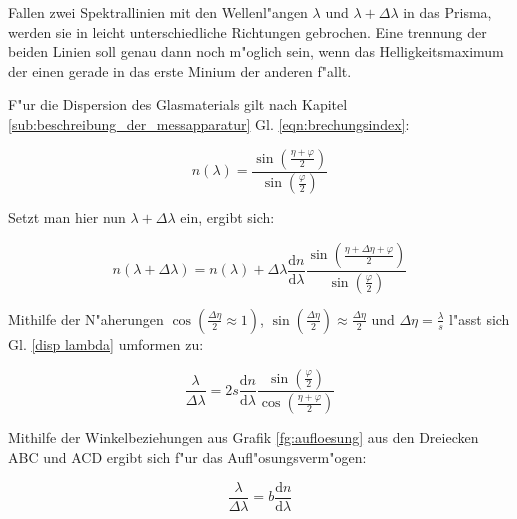 	Fallen zwei Spektrallinien mit den Wellenl"angen $\lambda$ und $\lambda + \Delta\lambda$ in das Prisma, werden sie in leicht unterschiedliche Richtungen gebrochen.
	Eine trennung der beiden Linien soll genau dann noch m"oglich sein, wenn das Helligkeitsmaximum der einen gerade in das erste Minium der anderen f"allt.

	F"ur die Dispersion des Glasmaterials gilt nach Kapitel \ref{sub:beschreibung_der_messapparatur} Gl. \eqref{eqn:brechungsindex}:

	\begin{equation}
		n(\lambda) = \frac{\sin( \frac{\eta + \varphi}{2} )}{\sin(\frac{\varphi}{2})} 
	\end{equation}

	Setzt man hier nun $\lambda + \Delta\lambda$ ein, ergibt sich:

	\begin{equation}
		n(\lambda + \Delta\lambda) = n(\lambda) + \Delta\lambda \frac{\mathrm{d}n}{\mathrm{d}\lambda}	\frac{\sin( \frac{\eta + \Delta\eta + \varphi}{2} )}{\sin(\frac{\varphi}{2})}  \label{disp lambda}
	\end{equation}

	Mithilfe der N"aherungen $\cos(\frac{\Delta\eta}{2} \approx 1)$, $\sin(\frac{\Delta\eta}{2}) \approx \frac{\Delta\eta}{2}$ und $\Delta\eta = \frac{\lambda}{s}$ l"asst sich Gl. \eqref{disp lambda} umformen zu:

	\begin{equation}
		\frac{\lambda}{\Delta\lambda} = 2s \frac{\mathrm{d}n}{\mathrm{d}\lambda} \frac{\sin(\frac{\varphi}{2})}{\cos(\frac{\eta+\varphi}{2})} 
	\end{equation}

	Mithilfe der Winkelbeziehungen aus Grafik \ref{fg:aufloesung} aus den Dreiecken ABC und ACD ergibt sich f"ur das Aufl"osungsverm"ogen:

	\begin{equation}
		\frac{\lambda}{\Delta\lambda} = b \frac{\mathrm{d}n}{\mathrm{d}\lambda} 
	\end{equation}